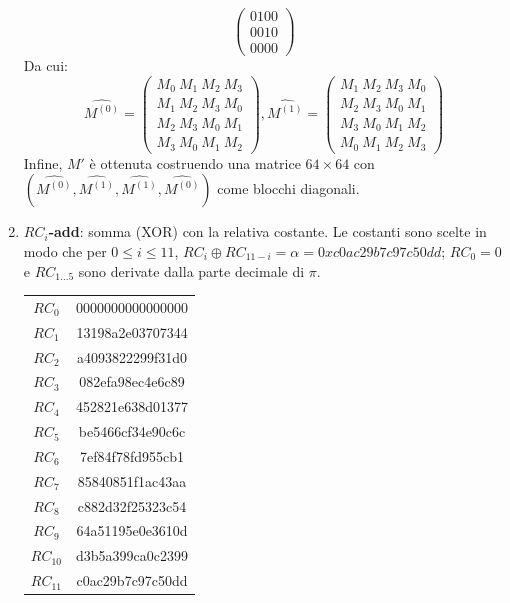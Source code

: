 \documentclass[target=bach,aauheader=,style=]{thud}
\begin{document}
\begin{enumerate}
\[\begin{pmatrix}
					0100\\
					0010\\
					0000
				\end{pmatrix}
				\]
				Da cui:
				\[ \hat{M^{(0)}} = 
				\begin{pmatrix}
					M_0\ M_1\ M_2\ M_3\\
					M_1\ M_2\ M_3\ M_0\\
					M_2\ M_3\ M_0\ M_1\\
					M_3\ M_0\ M_1\ M_2
				\end{pmatrix},
				\hat{M^{(1)}} = 
				\begin{pmatrix}
					M_1\ M_2\ M_3\ M_0\\
					M_2\ M_3\ M_0\ M_1\\
					M_3\ M_0\ M_1\ M_2\\
					M_0\ M_1\ M_2\ M_3
				\end{pmatrix}
				\]
				Infine, $M'$ è ottenuta costruendo una matrice $64 \times 64$ con $(\hat{M^{(0)}} , \hat{M^{(1)}}, \hat{M^{(1)}}, \hat{M^{(0)}})$ come blocchi diagonali.
				\item \textbf{$RC_i$-add}: somma (XOR) con la relativa costante. Le costanti sono scelte in modo che per $0 \le i \le 11$, $RC_i \oplus RC_{11-i} = \alpha = 0xc0ac29b7c97c50dd$; $RC_0 = 0$ e $RC_{1...5}$ sono derivate dalla parte decimale di $\pi$.
				\begin{center}
					\begin{tabular}{|c||c|}
						\hline
						$RC_0$ & 0000000000000000 \\
						$RC_1$ & 13198a2e03707344 \\
						$RC_2$ & a4093822299f31d0 \\
						$RC_3$ & 082efa98ec4e6c89 \\
						$RC_4$ & 452821e638d01377 \\
						$RC_5$ & be5466cf34e90c6c \\
						$RC_6$ & 7ef84f78fd955cb1 \\
						$RC_7$ & 85840851f1ac43aa \\
						$RC_8$ & c882d32f25323c54 \\
						$RC_9$ & 64a51195e0e3610d \\
						$RC_{10}$ & d3b5a399ca0c2399 \\
						$RC_{11}$ & c0ac29b7c97c50dd \\
						\hline
					\end{tabular}
				\end{center}
			\end{enumerate}
\end{document}
